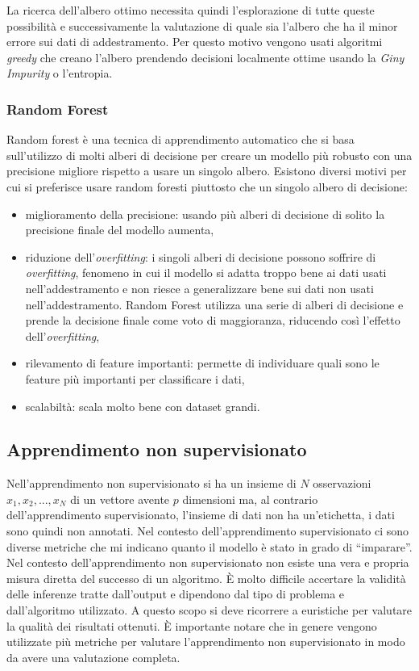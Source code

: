 \documentclass[12pt,italian]{report}
\begin{document}
	La ricerca dell'albero ottimo necessita quindi l'esplorazione di tutte queste possibilità e successivamente la valutazione di quale sia l'albero che ha il minor errore sui dati di addestramento. Per questo motivo vengono usati algoritmi \textit{greedy} che creano l'albero prendendo decisioni localmente ottime usando la \textit{Giny Impurity} o l'entropia.


	\subsubsection{Random Forest}
	\label{RandomForest}
	Random forest è una tecnica di apprendimento automatico che si basa sull'utilizzo di molti alberi di decisione per creare un modello più robusto con una precisione migliore rispetto a usare un singolo albero. Esistono diversi motivi per cui si preferisce usare random foresti piuttosto che un singolo albero di decisione:
	\begin{itemize}
		\item miglioramento della precisione: usando più alberi di decisione di solito la precisione finale del modello aumenta,
		\item riduzione dell'\textit{overfitting}: i singoli alberi di decisione possono soffrire di \textit{overfitting}, fenomeno in cui il modello si adatta troppo bene ai dati usati nell'addestramento e non riesce a generalizzare bene sui dati non usati nell'addestramento. Random Forest utilizza una serie di alberi di decisione e prende la decisione finale come voto di maggioranza, riducendo così l'effetto dell'\textit{overfitting},
		\item rilevamento di feature importanti: permette di individuare quali sono le feature più importanti per classificare i dati,
		\item scalabiltà: scala molto bene con dataset grandi.
	\end{itemize}
	
	\subsection{Apprendimento non supervisionato}
	Nell'apprendimento non supervisionato si ha un insieme di $N$ osservazioni $x_1, x_2,...,x_N$ di un vettore avente $p$ dimensioni ma, al contrario dell'apprendimento supervisionato, l'insieme di dati non ha un'etichetta, i dati sono quindi non annotati.
	Nel contesto dell'apprendimento supervisionato ci sono diverse metriche che mi indicano quanto il modello è stato in grado di ``imparare''. Nel contesto dell'apprendimento non supervisionato non esiste una vera e propria misura diretta del successo di un algoritmo. È molto difficile accertare la validità delle inferenze tratte dall'output e dipendono dal tipo di problema e dall'algoritmo utilizzato. A questo scopo si deve ricorrere a euristiche per valutare la qualità dei risultati ottenuti. È importante notare che in genere vengono utilizzate più metriche per valutare l'apprendimento non supervisionato in modo da avere una valutazione completa. 
	
\end{document}

